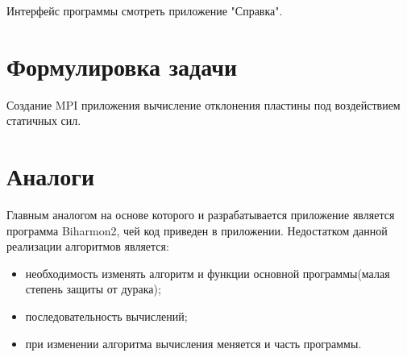 Интерфейс программы смотреть приложение "Справка".

\section{Формулировка задачи}
Создание MPI приложения вычисление отклонения пластины под воздействием статичных сил.
\section{Аналоги}
Главным аналогом на основе которого и разрабатывается приложение является программа Biharmon2, чей код приведен в приложении. Недостатком данной реализации алгоритмов является:
\begin{itemize}
	\item необходимость изменять алгоритм и функции основной программы(малая степень защиты от дурака);
	\item последовательность вычислений;
	\item при изменении алгоритма вычисления меняется и часть программы.
\end{itemize}


